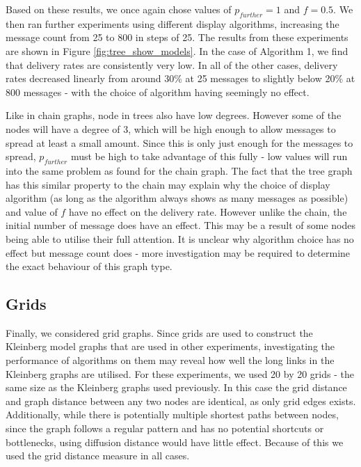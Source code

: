 \documentclass[bsc,frontabs,twoside,singlespacing,parskip,deptreport]{infthesis}     %
\begin{document}
Based on these results, we once again chose values of $p_{further}=1$ and $f=0.5$. We then ran further experiments using different display algorithms, increasing the message count from 25 to 800 in steps of 25. The results from these experiments are shown in Figure \ref{fig:tree_show_models}. In the case of Algorithm 1, we find that delivery rates are consistently very low. In all of the other cases, delivery rates decreased linearly from around 30\% at 25 messages to slightly below 20\% at 800 messages - with the choice of algorithm having seemingly no effect.

Like in chain graphs, node in trees also have low degrees. However some of the nodes will have a degree of 3, which will be high enough to allow messages to spread at least a small amount. Since this is only just enough for the messages to spread, $p_{further}$ must be high to take advantage of this fully - low values will run into the same problem as found for the chain graph. The fact that the tree graph has this similar property to the chain may explain why the choice of display algorithm (as long as the algorithm always shows as many messages as possible) and value of $f$ have no effect on the delivery rate. However unlike the chain, the initial number of message does have an effect. This may be a result of some nodes being able to utilise their full attention. It is unclear why algorithm choice has no effect but message count does - more investigation may be required to determine the exact behaviour of this graph type.


\subsection{Grids}
Finally, we considered grid graphs. Since grids are used to construct the Kleinberg model graphs that are used in other experiments, investigating the performance of algorithms on them may reveal how well the long links in the Kleinberg graphs are utilised. For these experiments, we used 20 by 20 grids - the same size as the Kleinberg graphs used previously. In this case the grid distance and graph distance between any two nodes are identical, as only grid edges exists. Additionally, while there is potentially multiple shortest paths between nodes, since the graph follows a regular pattern and has no potential shortcuts or bottlenecks, using diffusion distance would have little effect. Because of this we used the grid distance measure in all cases.
\end{document}
